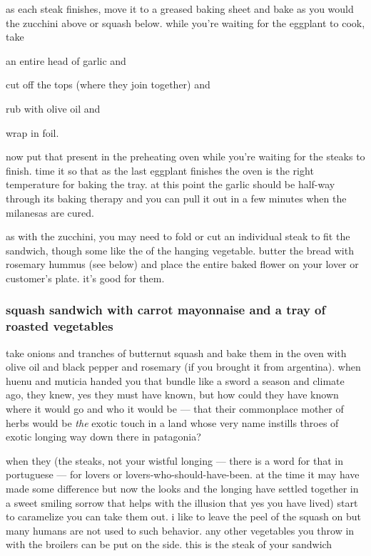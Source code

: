 as each steak finishes, move it to a greased baking sheet and bake as
you would the zucchini above or squash below. while you're waiting for
the eggplant to cook, take

\begin{algorithm}
  \item an entire head of garlic and
  \item cut off the tops (where they join together) and
  \item rub with olive oil and
  \item wrap in foil.
\end{algorithm}

now put that present in the preheating oven while you're waiting
for the steaks to finish. time it so that as the last eggplant
finishes the oven is the right temperature for baking the tray. at
this point the garlic should be half-way through its baking therapy
and you can pull it out in a few minutes when the milanesas are cured.

as with the zucchini, you may need to fold or cut an individual steak
to fit the sandwich, though some like the  of the hanging
vegetable. butter the bread with rosemary \gls{hummus} (see below) and place
the entire baked flower on your lover or customer's plate. it's good
for them.

\subsubsection{squash sandwich with carrot mayonnaise and a tray of roasted vegetables}

take onions and \gls{tranches} of butternut
squash and bake them in the oven with olive oil and black pepper and
rosemary (if you brought it from argentina). when huenu and muticia
handed you that bundle like a sword a season and climate ago, they
knew, yes they must have known, but how could they have known where it
would go and who it would be --- that their commonplace mother of
herbs would be \textit{the} exotic touch in a land whose very name
instills throes of exotic longing way down there in patagonia?

when they (the steaks, not your wistful longing --- there is a word
for that in portuguese --- for lovers or lovers-who-should-have-been. at the time it may have made some difference but now the looks
and the longing have settled together in a sweet smiling sorrow that
helps with the illusion that yes you have lived) start to caramelize
you can take them out. i like to leave the peel of the squash on but
many humans are not used to such behavior. any other vegetables you
throw in with the broilers can be put on the side. this is the steak
of your sandwich

